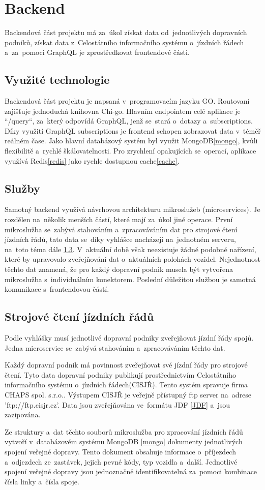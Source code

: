 \section{Backend}
Backendová část projektu má za~úkol získat data od~jednotlivých dopravních podniků, získat data z~Celostátního informačního systému o~jízdních řádech\cite{cisjr} a~za~pomoci GraphQL je zprostředkovat frontendové části.
\subsection{Využité technologie} Backendová část projektu je napsaná v~programovacím jazyku GO. Routovaní zajišťuje jednoduchá knihovna Chi-go. Hlavním endpointem celé aplikace je “/query“, za~který odpovídá GraphQL, jenž se~stará o~dotazy a~subscriptions. Díky využití GraphQL subscriptions je frontend schopen zobrazovat data v~téměř reálném čase. Jako hlavní databázový systém byl využit MongoDB\ref{mongo}, kvůli flexibilitě a~rychlé škálovatelnosti. Pro zrychlení opakujících se~operací, aplikace využívá Redis\ref{redis} jako rychle dostupnou cache\ref{cache}. \par
\subsection{Služby}
Samotný backend využívá návrhovou architekturu mikroslužeb (microservices). Je rozdělen na~několik menších částí, které mají za~úkol jiné operace. První mikroslužba se~zabývá stahováním a~zpracováváním dat pro strojové čtení jízdních řádů, tato data se~díky vyhlášce\cite{vyhlaskaJizdniRady} nacházejí na~jednotném serveru, na~toto téma dále \ref{strojoveCteniJR}. V~aktuální době však neexistuje žádné podobné nařízení, které by upravovalo zveřejňování dat o~aktuálních polohách vozidel. Nejednotnost těchto dat znamená, že pro každý dopravní podnik musela být vytvořena mikroslužba s~individuálním konektorem. Poslední důležitou službou je samotná komunikace s~frontendovou částí.
\subsection [Jízdní řády]{Strojové čtení jízdních řádů} \label{strojoveCteniJR}
Podle vyhlášky\cite{vyhlaskaJizdniRady} musí jednotlivé dopravní podniky zveřejňovat jízdní řády spojů. Jedna microservice se~zabývá stahováním a~zpracováváním těchto dat. \par Každý dopravní podnik má povinnost zveřejňovat své jízdní řády pro strojové čtení. Tyto data dopravní podniky publikují prostřednictvím Celostátního informačního systému o~jízdních řádech(CISJŘ)\cite{cisjr}. Tento systém spravuje firma CHAPS spol. s.r.o.\cite{chaps}. Výstupem CISJŘ je veřejně přístupný ftp server na~adrese 'ftp://ftp.cisjr.cz'. Data jsou zveřejňována ve~formátu JDF \ref{JDF} a~jsou zazipována. \par Ze struktury a~dat těchto souborů mikroslužba pro zpracování jízdních řádů vytvoří v~databázovém systému MongoDB \ref{mongo} dokumenty jednotlivých spojení veřejné dopravy. Tento dokument obsahuje informace o~příjezdech a~odjezdech ze~zastávek, jejich pevné kódy, typ vozidla a~další. Jednotlivé spojení veřejné dopravy jsou jednoznačně identifikovatelná za~pomoci kombinace čísla linky a~čísla spoje.
